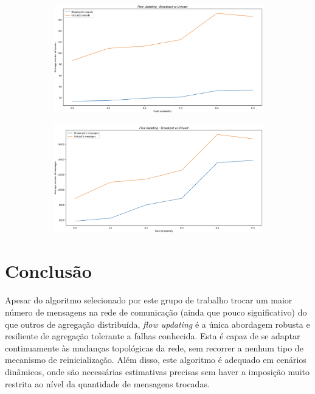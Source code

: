 \documentclass[a4paper]{article}
\begin{document}
{	\begin{figure}[H]
		\centering
		\begin{subfigure}[b]{0.7\textwidth}
			\includegraphics[width=1.0\textwidth]{Images/Plot3.png}
			\label{fig:1}
		\end{subfigure}
		\begin{subfigure}[b]{0.7\textwidth}
			\includegraphics[width=1.0\textwidth]{Images/Plot4.png}
			\label{fig:1}
		\end{subfigure}
	\end{figure}
}

\section{Conclusão} \label{sec:Conclusion}
\large{
	Apesar do algoritmo selecionado por este grupo de trabalho trocar um maior número de mensagens na rede de comunicação (ainda que pouco significativo) do que outros de agregação distribuída, \textit{flow updating} é a única abordagem robusta e resiliente de agregação tolerante a falhas conhecida.
	Esta é capaz de se adaptar continuamente às mudanças topológicas da rede, sem recorrer a nenhum tipo de mecanismo de reinicialização. Além disso, este algoritmo é adequado em cenários dinâmicos, onde são necessárias estimativas precisas sem haver a imposição muito restrita ao nível da quantidade de mensagens trocadas.
}

\printbibliography[heading=bibintoc]
\end{document}
